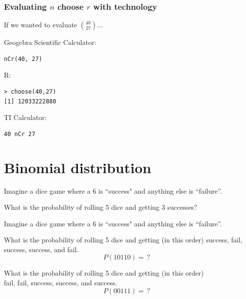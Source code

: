 \begin{frame}[fragile]
\frametitle{Evaluating $n$ choose $r$ with technology}
If we wanted to evaluate $40 \choose 27$...

Geogebra Scientific Calculator:
\begin{beamerboxesrounded}[shadow = true, lower = code body]{}
{
\begin{verbatim}
nCr(40, 27)
\end{verbatim}
}
\end{beamerboxesrounded}
    
R:
\begin{beamerboxesrounded}[shadow = true, lower = code body]{}
{
\begin{verbatim}
> choose(40,27)
[1] 12033222880
\end{verbatim}
}
\end{beamerboxesrounded}

TI Calculator:
\begin{beamerboxesrounded}[shadow = true, lower = code body]{}
{
\begin{verbatim}
40 nCr 27
\end{verbatim}
}
\end{beamerboxesrounded}

\end{frame}




\section{Binomial distribution}


\begin{frame}
Imagine a dice game where a 6 is ``success" and anything else is ``failure''. 

What is the probability of rolling 5 dice and getting 3 successes?
\pause

\vspace{40pt}
\end{frame}



\begin{frame}
Imagine a dice game where a 6 is ``success" and anything else is ``failure''. 

What is the probability of rolling 5 dice and getting (in this order) success, fail, success, success, and fail.
$$P(10110) = \,?$$

\pause
{}

\pause \vfill
What is the probability of rolling 5 dice and getting (in this order) \\fail, fail, success, success, and success.
$$P(00111)=\,?$$

\pause
{}

\vfill
\end{frame}



